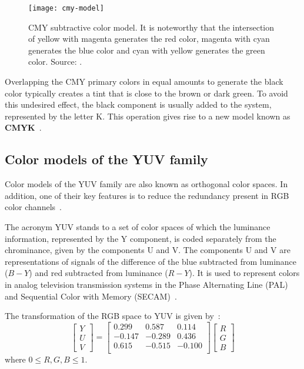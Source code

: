 \begin{figure}[!ht]
  \centering
  \texttt{[image: cmy-model]}
  \caption[CMY subtractive color model]{CMY subtractive color model. It is noteworthy that the intersection of yellow with magenta generates the red color, magenta with cyan generates the blue color and cyan with yellow generates the green color. Source: \citet{rus:08}.}
  \label{fig:cmy-model}
\end{figure}

Overlapping the CMY primary colors in equal amounts to generate the black color typically creates a tint that is close to the brown or dark green. To avoid this undesired effect, the black component is usually added to the system, represented by the letter K. This operation gives rise to a new model known as \textbf{CMYK}~\citep{gonzalez:02}.


\subsection{Color models of the YUV family}
\label{sec:modelo_cores_yuv}

Color models of the YUV family are also known as orthogonal color spaces. In addition, one of their key features is to reduce the redundancy present in RGB color channels~\citep{kakumanu:07}.

The acronym YUV stands to a set of color spaces of which the luminance information, represented by the Y component, is coded separately from the chrominance, given by the components U and V. The components U and V are representations of signals of the difference of the blue subtracted from luminance ($B-Y$) and red subtracted from luminance ($R-Y$). It is used to represent colors in analog television transmission systems in the Phase Alternating Line (PAL) and Sequential Color with Memory (SECAM)~\citep{pedrini:08}.

The transformation of the RGB space to YUV is given by~\citep{pedrini:08}:\\
\begin{equation}
  \begin{bmatrix}
    Y \\ U \\ V
  \end{bmatrix} = 
  \begin{bmatrix}
     0.299 &  0.587 &  0.114 \\
    -0.147 & -0.289 &  0.436 \\
     0.615 & -0.515 & -0.100 \\
  \end{bmatrix}
  \begin{bmatrix}
    R \\ G \\ B
  \end{bmatrix}
\end{equation}
where $0 \leq R, G, B \leq 1$.

